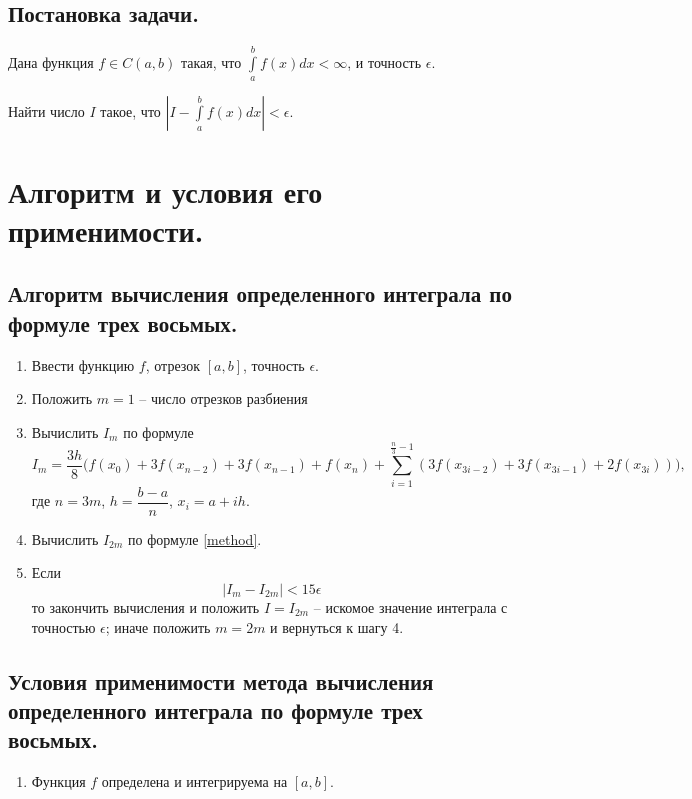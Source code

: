 \documentclass[a4paper, 12pt]{article}
\begin{document}
	\subsection{Постановка задачи.}
	
	Дана функция $f\in C(a,b)$ такая, что $\int\limits_a^bf(x)dx<\infty$, и точность $\epsilon$. 
	
	Найти число $I$ такое, что $|I-\int\limits_a^bf(x)dx|<\epsilon$.
	
	\section{Алгоритм и условия его применимости.}
	
	\subsection{Алгоритм вычисления определенного интеграла по формуле трех восьмых.}
	\label{alghorithm}
	
	\begin{enumerate}
		\item Ввести функцию $f$, отрезок $[a,b]$, точность $\epsilon$.
		\item Положить $m=1$ -- число отрезков разбиения
		\item Вычислить $I_m$ по формуле
		\begin{equation} \label{method}
			I_m=\frac{3h}{8}\bigg(f(x_0)+3f(x_{n-2})+3f(x_{n-1})+f(x_n)+\sum\limits_{i=1}^{\frac{n}{3}-1}(3f(x_{3i-2})+3f(x_{3i-1})+2f(x_{3i}))\bigg),
		\end{equation}
		где $n=3m$, $h=\dfrac{b-a}{n}$, $x_i=a+ih$.
		\item Вычислить $I_{2m}$ по формуле \eqref{method}.
		\item Если
		\begin{equation}
			|I_m-I_{2m}|<15\epsilon
		\end{equation}
		то закончить вычисления и положить $I=I_{2m}$ -- искомое значение интеграла с точностью $\epsilon$; иначе положить $m=2m$ и вернуться к шагу 4.
	\end{enumerate}
	
	\subsection{Условия применимости метода вычисления определенного интеграла по формуле трех восьмых.}
	
	\begin{enumerate}
		\item Функция $f$ определена и интегрируема на $[a,b]$.
	\end{enumerate}
	
\end{document}
